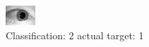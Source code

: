 \begin{figure}[h!]
\begin{center}
\includegraphics[width=0.60\columnwidth]{figures/ID1438_class_2_target_1.png}
\end{center}
\caption{ Classification: 2 actual target: 1}
\label{fig:ID1438_class_2_target_1}
\end{figure}
